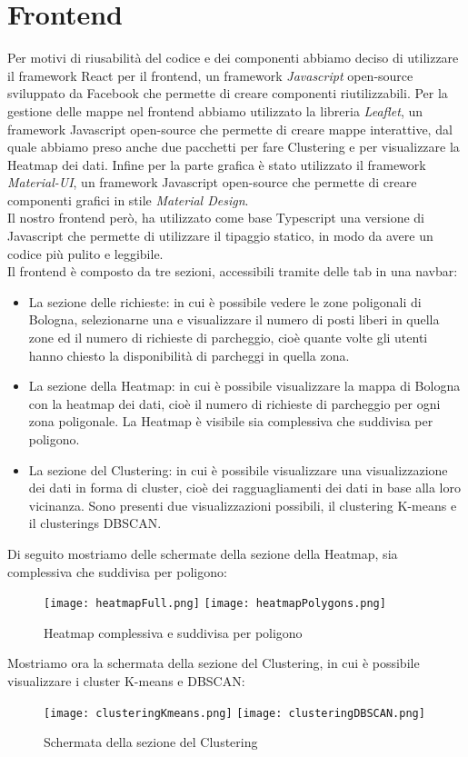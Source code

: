 \documentclass[../../Report.tex]{subfiles}
\begin{document}
\section{Frontend}
    Per  motivi di riusabilità del codice e dei componenti abbiamo deciso di utilizzare il framework React per il frontend, un framework \emph{Javascript} open-source sviluppato da Facebook che permette di creare componenti riutilizzabili. 
    Per la gestione delle mappe nel frontend abbiamo utilizzato la libreria \emph{Leaflet}, un framework Javascript open-source che permette di creare mappe interattive, dal quale abbiamo preso anche due pacchetti per fare Clustering e per visualizzare la Heatmap dei dati. Infine per la parte grafica è stato utilizzato il framework \emph{Material-UI}, un framework Javascript open-source che permette di creare componenti grafici in stile \emph{Material Design}.\\
    Il nostro frontend però, ha utilizzato come base Typescript una versione di Javascript che permette di utilizzare il tipaggio statico, in modo da avere un codice più pulito e leggibile.\\
    Il frontend è composto da tre sezioni, accessibili tramite delle tab in una navbar: 
    \begin{itemize}
      \item La sezione delle richieste: in cui è possibile vedere le zone poligonali di Bologna, selezionarne una e visualizzare il numero di posti liberi in quella zone ed il numero di richieste di parcheggio, cioè quante volte gli utenti hanno chiesto la disponibilità di parcheggi in quella zona.
      \item La sezione della Heatmap: in cui è possibile visualizzare la mappa di Bologna con la heatmap dei dati, cioè il numero di richieste di parcheggio per ogni zona poligonale. La Heatmap è visibile sia complessiva che suddivisa per poligono.
      \item La sezione del Clustering: in cui è possibile visualizzare una visualizzazione dei dati in forma di cluster, cioè dei ragguagliamenti dei dati in base alla loro vicinanza. Sono presenti due visualizzazioni possibili, il clustering K-means e il clusterings DBSCAN. 
    \end{itemize}
    Di seguito mostriamo delle schermate della sezione della Heatmap, sia complessiva che suddivisa per poligono:
    \begin{figure}[H]
        \centering
        \texttt{[image: heatmapFull.png]}
        \texttt{[image: heatmapPolygons.png]}
        \caption{Heatmap complessiva e suddivisa per poligono}
        \label{fig:heatmap}
    \end{figure}
    Mostriamo ora la schermata della sezione del Clustering, in cui è possibile visualizzare i cluster K-means e DBSCAN:
    \begin{figure}[H]
        \centering
        \texttt{[image: clusteringKmeans.png]}
        \texttt{[image: clusteringDBSCAN.png]}
        \caption{Schermata della sezione del Clustering}
        \label{fig:clustering}
    \end{figure}
    

    
\end{document}
